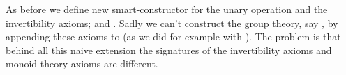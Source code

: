 \begin{code}
\>[0]\AgdaSpace{}%
\AgdaSpace{}%
\AgdaSymbol{:}\AgdaSpace{}%
\AgdaSpace{}%
\AgdaSpace{}%
\AgdaSpace{}%
\AgdaSpace{}%
\AgdaSpace{}%
\AgdaSpace{}%
\<%
\\
\>[0][@{}l@{\AgdaIndent{0}}]%
\>[3]\AgdaSpace{}%
\AgdaSymbol{:}\AgdaSpace{}%
\AgdaSpace{}%
\AgdaSymbol{\{}\AgdaSpace{}%
\AgdaSymbol{\}}\AgdaSpace{}
\AgdaSpace{}%
\AgdaSymbol{(}
\AgdaSpace{}%
\AgdaSymbol{(}\AgdaSpace{}%
\AgdaOperator{\AgdaInductiveConstructor{,}}\AgdaSpace{}%
\AgdaSymbol{)}
\AgdaSymbol{)}
\AgdaSpace{}%
\AgdaSpace{}%
\AgdaSymbol{(}\AgdaSpace{}%
\AgdaOperator{\AgdaInductiveConstructor{,}}\AgdaSpace{}%
\AgdaSymbol{)}
\<%
\\
%
\>[3]\AgdaSpace{}%
\AgdaSymbol{:}\AgdaSpace{}%
\AgdaSpace{}%
\AgdaSymbol{(}\AgdaOperator{\AgdaFunction{[}}\AgdaSpace{}%
\AgdaSpace{}%
\AgdaOperator{\AgdaFunction{]}}\AgdaSpace{}%
\AgdaOperator{\AgdaInductiveConstructor{,}}\AgdaSpace{}%
\AgdaSymbol{)}\<%
\\
\\
\>[0]\AgdaSpace{}%
\AgdaSymbol{:}\AgdaSpace{}%
\<%
\\
\>[0]\AgdaSpace{}%
\AgdaSymbol{=}\AgdaSpace{}%
\AgdaSpace{}%
\AgdaSymbol{\{}\AgdaSpace{}%
\AgdaSpace{}%
\AgdaSymbol{=}\AgdaSpace{}%
\AgdaSpace{}%
\AgdaSymbol{;}\AgdaSpace{}%
\AgdaSpace{}%
\AgdaSymbol{=}\AgdaSpace{}%
\AgdaSpace{}%
\AgdaSymbol{\}}\<%
\end{code}

As before we define new smart-constructor for the unary operation and the
invertibility axioms; \AgdaSpace{}%
\AgdaSymbol{=}\AgdaSpace{}%
\AgdaSpace{}%
\AgdaSymbol{(}\AgdaSpace{}%
\AgdaSpace{}%
\AgdaSymbol{(}\AgdaSpace{}%
\AgdaSymbol{))}\AgdaSpace{}%
\AgdaSpace{}%
 and
\AgdaSpace{}%
\AgdaSymbol{=}\AgdaSpace{}%
\AgdaSpace{}%
\AgdaSymbol{((}\AgdaSpace{}%
\AgdaSymbol{)}\AgdaSpace{}%
\AgdaSpace{}%
\AgdaSymbol{)}\AgdaSpace{}%
\AgdaSpace{}%
. Sadly we can't construct the group theory, say
, by appending these axioms to 
(as we did for example with ). The problem is that
behind all this naive extension the signatures of the invertibility axioms and
monoid theory axioms are different.

